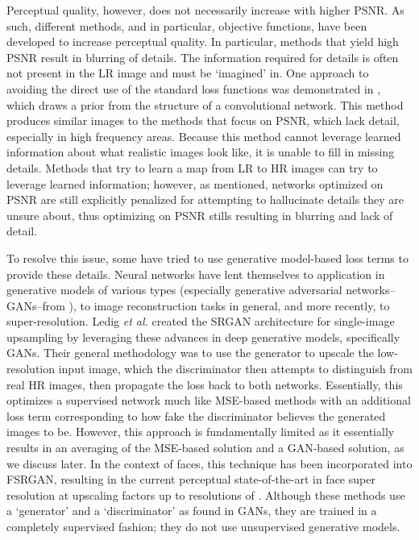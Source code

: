 \documentclass[10pt,twocolumn,letterpaper]{article}
\begin{document}
Perceptual quality, however, does not necessarily increase with higher PSNR. As such, different methods, and in particular, objective functions, have been developed to increase perceptual quality. In particular, methods that yield high PSNR result in blurring of details. The information required for details is often not present in the LR image and must be `imagined' in. One approach to avoiding the direct use of the standard loss functions was demonstrated in \cite{deep_prior}, which draws a prior from the structure of a convolutional network. This method produces similar images to the methods that focus on PSNR, which lack detail, especially in high frequency areas. Because this method cannot leverage learned information about what realistic images look like, it is unable to fill in missing details. Methods that try to learn a map from LR to HR images can try to leverage learned information; however, as mentioned, networks optimized on PSNR are still explicitly penalized for attempting to hallucinate details they are unsure about, thus optimizing on PSNR stills resulting in blurring and lack of detail. 


To resolve this issue, some have tried to use generative model-based loss terms to provide these details. Neural networks have lent themselves to application in generative models of various types (especially generative adversarial networks--GANs--from \cite{goodfellow2014generative}), to image reconstruction tasks in general, and more recently, to super-resolution. Ledig \textit{et al.} \cite{SRGAN} created the SRGAN architecture for single-image upsampling by leveraging these advances in deep generative models, specifically GANs. Their general methodology was to use the generator to upscale the low-resolution input image, which the discriminator then attempts to distinguish from real HR images, then propagate the loss back to both networks. Essentially, this optimizes a supervised network much like MSE-based methods with an additional loss term corresponding to how fake the discriminator believes the generated images to be. However, this approach is fundamentally limited as it essentially results in an averaging of the MSE-based solution and a GAN-based solution, as we discuss later. In the context of faces, this technique has been incorporated into FSRGAN, resulting in the current perceptual state-of-the-art in face super resolution at  upscaling factors up to resolutions of . Although these methods use a `generator' and a `discriminator' as found in GANs, they are trained in a completely supervised fashion; they do not use unsupervised generative models. 
\end{document}
